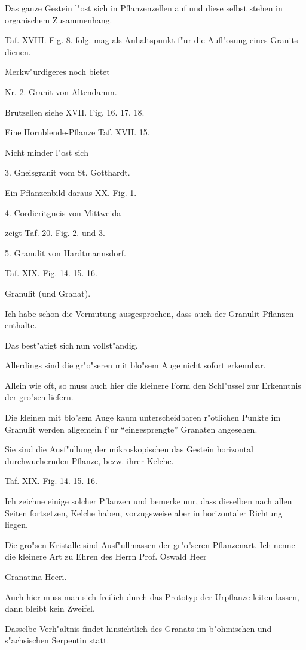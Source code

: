 \documentclass[a4paper, 11pt, oneside, german]{article}
\begin{document}
Das ganze Gestein l"ost sich in Pflanzenzellen auf und diese selbst stehen in organischem Zusammenhang.

Taf. XVIII. Fig. 8. folg. mag als Anhaltspunkt f"ur die Aufl"osung eines Granits dienen.

Merkw"urdigeres noch bietet

Nr. 2. Granit von Altendamm.

Brutzellen siehe XVII. Fig. 16. 17. 18.

Eine Hornblende-Pflanze Taf. XVII. 15.

Nicht minder l"ost sich

3. Gneisgranit vom St. Gotthardt.

Ein Pflanzenbild daraus XX. Fig. 1.

4. Cordieritgneis von Mittweida

zeigt Taf. 20. Fig. 2. und 3.

5. Granulit von Hardtmannsdorf.

Taf. XIX. Fig. 14. 15. 16.

Granulit (und Granat).

Ich habe schon die Vermutung ausgesprochen, dass auch der Granulit Pflanzen enthalte.

Das best"atigt sich nun vollst"andig.

Allerdings sind die gr"o"seren mit blo"sem Auge nicht sofort erkennbar.

Allein wie oft, so muss auch hier die kleinere Form den Schl"ussel zur Erkenntnis der gro"sen liefern.

Die kleinen mit blo"sem Auge kaum unterscheidbaren r"otlichen Punkte im Granulit werden allgemein f"ur "`eingesprengte"' Granaten angesehen.

Sie sind die Ausf"ullung der mikroskopischen das Gestein horizontal durchwuchernden Pflanze, bezw. ihrer Kelche.

Taf. XIX. Fig. 14. 15. 16.

Ich zeichne einige solcher Pflanzen und bemerke nur, dass dieselben nach allen Seiten fortsetzen, Kelche haben, vorzugsweise aber in horizontaler Richtung liegen.

Die gro"sen Kristalle sind Ausf"ullmassen der gr"o"seren Pflanzenart. Ich nenne die kleinere Art zu Ehren des Herrn Prof. Oswald Heer

Granatina Heeri.

Auch hier muss man sich freilich durch das Prototyp der Urpflanze leiten lassen, dann bleibt kein Zweifel.

Dasselbe Verh"altnis findet hinsichtlich des Granats im b"ohmischen und s"achsischen Serpentin statt.
\end{document}
